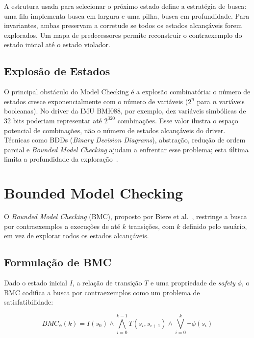 A estrutura usada para selecionar o próximo estado define a estratégia de busca: uma fila implementa busca em largura e uma pilha, busca em profundidade. Para invariantes, ambas preservam a corretude se todos os estados alcançáveis forem explorados. Um mapa de predecessores permite reconstruir o contraexemplo do estado inicial até o estado violador.

\subsection{Explosão de Estados}

O principal obstáculo do Model Checking é a explosão combinatória: o número de estados cresce exponencialmente com o número de variáveis ($2^n$ para $n$ variáveis booleanas). No driver da IMU BMI088, por exemplo, dez variáveis simbólicas de 32 bits poderiam representar até $2^{320}$ combinações. %
Esse valor ilustra o espaço potencial de combinações, não o número de estados alcançáveis do driver. Técnicas como BDDs (\textit{Binary Decision Diagrams}), abstração, redução de ordem parcial e \textit{Bounded Model Checking} ajudam a enfrentar esse problema; esta última limita a profundidade da exploração~\cite{Biere1999}.

\section{Bounded Model Checking}

O \textit{Bounded Model Checking} (BMC), proposto por Biere et
al.~\cite{Biere1999}, restringe a busca por contraexemplos a execuções de até $k$
transições, com $k$ definido pelo usuário, em vez de explorar todos os estados
alcançáveis.

\subsection{Formulação de BMC}

Dado o estado inicial $I$, a relação de transição $T$ e uma propriedade de
\textit{safety} $\phi$, o BMC codifica a busca por contraexemplos como um
problema de satisfatibilidade:

\begin{equation}
BMC_{\phi}(k) = I(s_0) \wedge \bigwedge_{i=0}^{k-1} T(s_i, s_{i+1}) \wedge
\bigvee_{i=0}^{k} \neg\phi(s_i)
\label{eq:bmc}
\end{equation}

